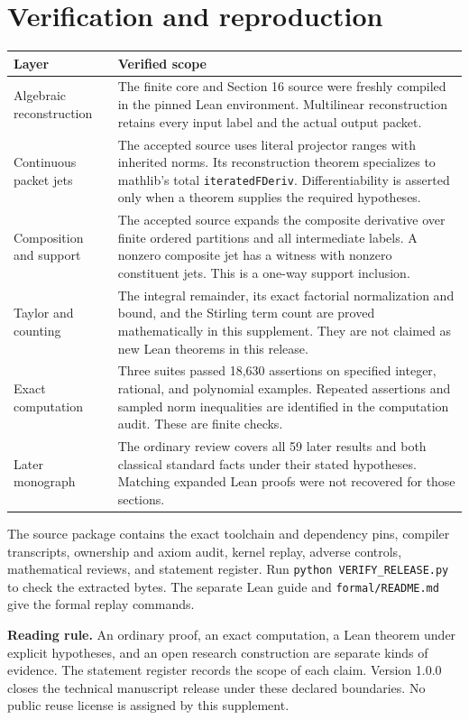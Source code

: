 \documentclass[11pt]{article}
\theoremstyle{remark}\newtheorem{remark}[theorem]{Remark}
\begin{document}
\section{Verification and reproduction}
\begin{longtable}{@{}p{.28\linewidth}p{.64\linewidth}@{}}
\toprule
\textbf{Layer}&\textbf{Verified scope}\\\midrule\endhead
Algebraic reconstruction&The finite core and Section 16 source were freshly compiled in the pinned Lean environment. Multilinear reconstruction retains every input label and the actual output packet.\\
Continuous packet jets&The accepted source uses literal projector ranges with inherited norms. Its reconstruction theorem specializes to mathlib's total \texttt{iteratedFDeriv}. Differentiability is asserted only when a theorem supplies the required hypotheses.\\
Composition and support&The accepted source expands the composite derivative over finite ordered partitions and all intermediate labels. A nonzero composite jet has a witness with nonzero constituent jets. This is a one-way support inclusion.\\
Taylor and counting&The integral remainder, its exact factorial normalization and bound, and the Stirling term count are proved mathematically in this supplement. They are not claimed as new Lean theorems in this release.\\
Exact computation&Three suites passed 18,630 assertions on specified integer, rational, and polynomial examples. Repeated assertions and sampled norm inequalities are identified in the computation audit. These are finite checks.\\
Later monograph&The ordinary review covers all 59 later results and both classical standard facts under their stated hypotheses. Matching expanded Lean proofs were not recovered for those sections.\\
\bottomrule
\end{longtable}

The source package contains the exact toolchain and dependency pins, compiler transcripts, ownership and axiom audit, kernel replay, adverse controls, mathematical reviews, and statement register. Run \texttt{python VERIFY\_RELEASE.py} to check the extracted bytes. The separate Lean guide and \texttt{formal/README.md} give the formal replay commands.

\noindent\textbf{Reading rule.} An ordinary proof, an exact computation, a Lean theorem under explicit hypotheses, and an open research construction are separate kinds of evidence. The statement register records the scope of each claim. Version 1.0.0 closes the technical manuscript release under these declared boundaries. No public reuse license is assigned by this supplement.
\end{document}
